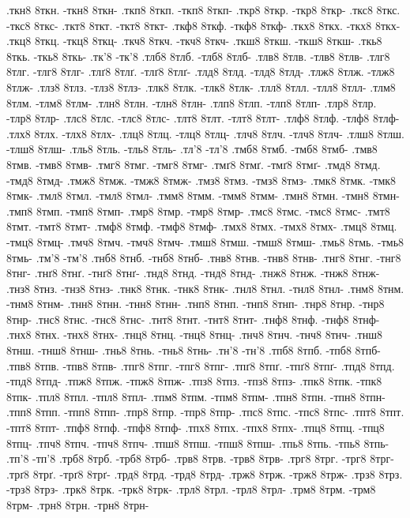 {.ткн8 8ткн. -ткн8 8ткн-
.ткп8 8ткп. -ткп8 8ткп-
.ткр8 8ткр. -ткр8 8ткр-
.ткс8 8ткс. -ткс8 8ткс-
.ткт8 8ткт. -ткт8 8ткт-
.ткф8 8ткф. -ткф8 8ткф-
.ткх8 8ткх. -ткх8 8ткх-
.ткц8 8ткц. -ткц8 8ткц-
.ткч8 8ткч. -ткч8 8ткч-
.ткш8 8ткш. -ткш8 8ткш-
.ткь8 8ткь. -ткь8 8ткь-
.тк'8 -тк'8
.тлб8 8тлб. -тлб8 8тлб-
.тлв8 8тлв. -тлв8 8тлв-
.тлг8 8тлг. -тлг8 8тлг-
.тлґ8 8тлґ. -тлґ8 8тлґ-
.тлд8 8тлд. -тлд8 8тлд-
.тлж8 8тлж. -тлж8 8тлж-
.тлз8 8тлз. -тлз8 8тлз-
.тлк8 8тлк. -тлк8 8тлк-
.тлл8 8тлл. -тлл8 8тлл-
.тлм8 8тлм. -тлм8 8тлм-
.тлн8 8тлн. -тлн8 8тлн-
.тлп8 8тлп. -тлп8 8тлп-
.тлр8 8тлр. -тлр8 8тлр-
.тлс8 8тлс. -тлс8 8тлс-
.тлт8 8тлт. -тлт8 8тлт-
.тлф8 8тлф. -тлф8 8тлф-
.тлх8 8тлх. -тлх8 8тлх-
.тлц8 8тлц. -тлц8 8тлц-
.тлч8 8тлч. -тлч8 8тлч-
.тлш8 8тлш. -тлш8 8тлш-
.тль8 8тль. -тль8 8тль-
.тл'8 -тл'8
.тмб8 8тмб. -тмб8 8тмб-
.тмв8 8тмв. -тмв8 8тмв-
.тмг8 8тмг. -тмг8 8тмг-
.тмґ8 8тмґ. -тмґ8 8тмґ-
.тмд8 8тмд. -тмд8 8тмд-
.тмж8 8тмж. -тмж8 8тмж-
.тмз8 8тмз. -тмз8 8тмз-
.тмк8 8тмк. -тмк8 8тмк-
.тмл8 8тмл. -тмл8 8тмл-
.тмм8 8тмм. -тмм8 8тмм-
.тмн8 8тмн. -тмн8 8тмн-
.тмп8 8тмп. -тмп8 8тмп-
.тмр8 8тмр. -тмр8 8тмр-
.тмс8 8тмс. -тмс8 8тмс-
.тмт8 8тмт. -тмт8 8тмт-
.тмф8 8тмф. -тмф8 8тмф-
.тмх8 8тмх. -тмх8 8тмх-
.тмц8 8тмц. -тмц8 8тмц-
.тмч8 8тмч. -тмч8 8тмч-
.тмш8 8тмш. -тмш8 8тмш-
.тмь8 8тмь. -тмь8 8тмь-
.тм'8 -тм'8
.тнб8 8тнб. -тнб8 8тнб-
.тнв8 8тнв. -тнв8 8тнв-
.тнг8 8тнг. -тнг8 8тнг-
.тнґ8 8тнґ. -тнґ8 8тнґ-
.тнд8 8тнд. -тнд8 8тнд-
.тнж8 8тнж. -тнж8 8тнж-
.тнз8 8тнз. -тнз8 8тнз-
.тнк8 8тнк. -тнк8 8тнк-
.тнл8 8тнл. -тнл8 8тнл-
.тнм8 8тнм. -тнм8 8тнм-
.тнн8 8тнн. -тнн8 8тнн-
.тнп8 8тнп. -тнп8 8тнп-
.тнр8 8тнр. -тнр8 8тнр-
.тнс8 8тнс. -тнс8 8тнс-
.тнт8 8тнт. -тнт8 8тнт-
.тнф8 8тнф. -тнф8 8тнф-
.тнх8 8тнх. -тнх8 8тнх-
.тнц8 8тнц. -тнц8 8тнц-
.тнч8 8тнч. -тнч8 8тнч-
.тнш8 8тнш. -тнш8 8тнш-
.тнь8 8тнь. -тнь8 8тнь-
.тн'8 -тн'8
.тпб8 8тпб. -тпб8 8тпб-
.тпв8 8тпв. -тпв8 8тпв-
.тпг8 8тпг. -тпг8 8тпг-
.тпґ8 8тпґ. -тпґ8 8тпґ-
.тпд8 8тпд. -тпд8 8тпд-
.тпж8 8тпж. -тпж8 8тпж-
.тпз8 8тпз. -тпз8 8тпз-
.тпк8 8тпк. -тпк8 8тпк-
.тпл8 8тпл. -тпл8 8тпл-
.тпм8 8тпм. -тпм8 8тпм-
.тпн8 8тпн. -тпн8 8тпн-
.тпп8 8тпп. -тпп8 8тпп-
.тпр8 8тпр. -тпр8 8тпр-
.тпс8 8тпс. -тпс8 8тпс-
.тпт8 8тпт. -тпт8 8тпт-
.тпф8 8тпф. -тпф8 8тпф-
.тпх8 8тпх. -тпх8 8тпх-
.тпц8 8тпц. -тпц8 8тпц-
.тпч8 8тпч. -тпч8 8тпч-
.тпш8 8тпш. -тпш8 8тпш-
.тпь8 8тпь. -тпь8 8тпь-
.тп'8 -тп'8
.трб8 8трб. -трб8 8трб-
.трв8 8трв. -трв8 8трв-
.трг8 8трг. -трг8 8трг-
.трґ8 8трґ. -трґ8 8трґ-
.трд8 8трд. -трд8 8трд-
.трж8 8трж. -трж8 8трж-
.трз8 8трз. -трз8 8трз-
.трк8 8трк. -трк8 8трк-
.трл8 8трл. -трл8 8трл-
.трм8 8трм. -трм8 8трм-
.трн8 8трн. -трн8 8трн-
}
